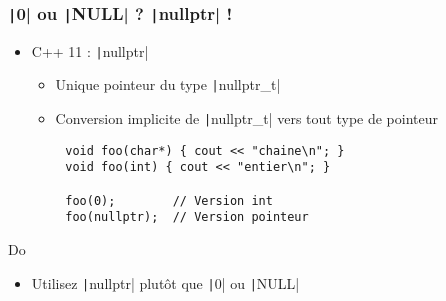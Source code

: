 \documentclass[C++.tex]{subfiles}
\begin{document}
\begin{frame}[fragile]
	\frametitle{\texttt|0| ou \texttt|NULL| ? \texttt|nullptr| !}
	\begin{itemize}
		\item C++ 11 : \texttt|nullptr|
		\begin{itemize}
			\item Unique pointeur du type \texttt|nullptr_t|
			\item Conversion implicite de \texttt|nullptr_t| vers tout type de pointeur
		\end{itemize}
	\end{itemize}

	\begin{verbatim}
		void foo(char*) { cout << "chaine\n"; }
		void foo(int) { cout << "entier\n"; }

		foo(0);        // Version int
		foo(nullptr);  // Version pointeur
	\end{verbatim}

	\begin{exampleblock}{Do}
		\begin{itemize}
			\item Utilisez \texttt|nullptr| plutôt que \texttt|0| ou \texttt|NULL|
		\end{itemize}
	\end{exampleblock}


\end{frame}
\end{document}
